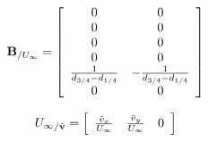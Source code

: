 \begin{equation}
\bm{\mathbf{B}}_{/U_\infty} = \left[
	\begin{array}{cc}
	0 & 0 \\
	0 & 0 \\
	0 & 0 \\
	0 & 0 \\
	\frac{1}{d_{3/4} - d_{1/4}} & 	-\frac{1}{d_{3/4} - d_{1/4}} \\
	0 & 0 
	\end{array}
	\right]
\end{equation}

\begin{equation}
	{U_\infty}_{/\tilde{\bm{\mathbf{v}}}} = \left[
	\begin{array}{ccc}
		\frac{\tilde{v}_x}{U_\infty} &
		\frac{\tilde{v}_y}{U_\infty} &
		0
	\end{array}
	\right]
\end{equation}

